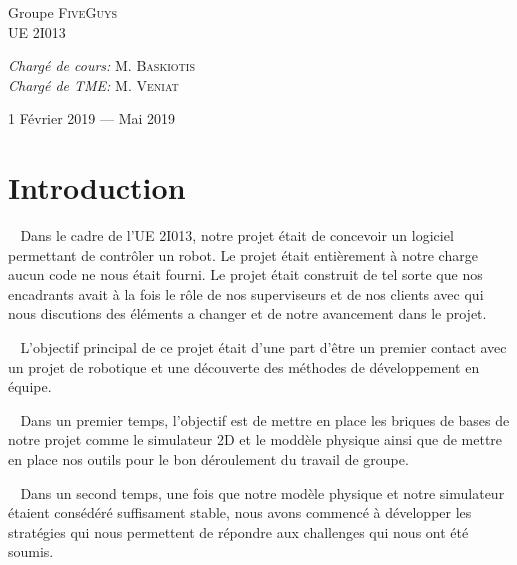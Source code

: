 \documentclass[12pt]{article}
\def\tab{$\>\>\>\>$}
\begin{document}
\begin{titlepage}
\begin{sffamily}
\begin{center}
    \begin{minipage}{0.4\textwidth}
      \begin{flushleft} \large
        Groupe \textsc{FiveGuys}\\
        UE 2I013\\
      \end{flushleft}
    \end{minipage}
    \begin{minipage}{0.4\textwidth}
      \begin{flushright} \large
        \emph{Chargé de cours:} M. \textsc{Baskiotis}\\
        \emph{Chargé de TME:} M. \textsc{Veniat}
      \end{flushright}
    \end{minipage}

    \vfill

    {\large 1\ier{} Février 2019 — Mai 2019}

  \end{center}
  \end{sffamily}
\end{titlepage}

\tableofcontents
\newpage

\section{Introduction}

\tab Dans le cadre de l'UE 2I013, notre projet était de concevoir un logiciel permettant de contrôler un robot. Le projet était entièrement à notre charge aucun code ne nous était fourni. Le projet était construit de tel sorte que nos encadrants avait à la fois le rôle de nos superviseurs et de nos clients avec qui nous discutions des éléments a changer et de notre avancement dans le projet.

\tab L'objectif principal de ce projet était d'une part d'être un premier contact avec un projet de robotique et une découverte des méthodes de développement en équipe.

\tab Dans un premier temps, l'objectif est de mettre en place les briques de bases de notre projet comme le simulateur 2D et le moddèle physique ainsi que de mettre en place nos outils pour le bon déroulement du travail de groupe.

\tab Dans un second temps, une fois que notre modèle physique et notre simulateur étaient consédéré suffisament stable, nous avons commencé à développer les stratégies qui nous permettent de répondre aux challenges qui nous ont été soumis.
\end{document}
